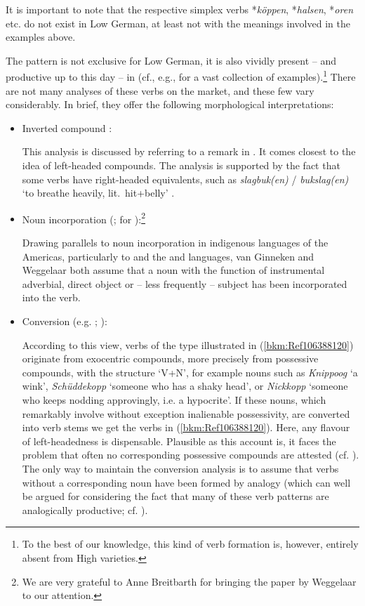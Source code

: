 \documentclass[output=paper
  ,nobabel
  ,draftmode
  ,colorlinks, citecolor=brown
]{langscibook}
\begin{document}
\noindent
It is important to note that the respective simplex verbs *\emph{köppen}, *\emph{halsen},
*\emph{oren} etc. do not exist in Low German, at least not with the meanings involved in the
examples above.

The pattern is not exclusive for Low German, it is also vividly present – and productive up to this
day – in  (cf., e.g., \citealt{AsdahlHolmberg1973} for a vast collection of
examples).\footnote{To the best of our knowledge, this kind of verb formation is, however, entirely
  absent from High  varieties.} There are not many analyses of these verbs on the market, and
these few vary considerably. In brief, they offer the following morphological interpretations:


\begin{itemize}
\item Inverted compound \citep{Henzen1965}:

This analysis is discussed by \citet[55--56]{AsdahlHolmberg1973} referring to a remark in
. It comes closest to the idea of left-headed compounds. The
analysis is supported by the fact that some verbs have right-headed equivalents, such as
\emph{slagbuk(en)} / \emph{bukslag(en)} `to breathe heavily, lit.\ hit+belly' \citep[53, 56]{AsdahlHolmberg1973}.

\largerpage
\item Noun incorporation (\citealt[Section~2]{vanGinneken1939}; \citealt{Weggelaar1986} for
  ):\footnote{We are very grateful to Anne Breitbarth for bringing the paper by Weggelaar
    to our attention.} 

Drawing parallels to noun incorporation in indigenous languages of the Americas, particularly to
 and the  and  languages, van Ginneken and Weggelaar both assume that a
noun with the function of instrumental adverbial, direct object or – less frequently – subject has
been incorporated into the verb.  

\item Conversion (e.g. \citealt[32--37]{Weise1920}; \citealt{AsdahlHolmberg1973}):

According to this view, verbs of the type illustrated in (\ref{bkm:Ref106388120}) originate from
exocentric compounds, more precisely from possessive compounds, with the structure `V+N', for
example nouns such as \emph{Knippoog} `a wink', \emph{Schüddekopp} `someone who has a shaky head',
or \emph{Nickkopp} `someone who keeps nodding approvingly, i.e. a hypocrite'. If these nouns, which
remarkably involve without exception inalienable possessivity, are converted into verb stems we get
the verbs in (\ref{bkm:Ref106388120}). Here, any flavour of left-headedness is
dispensable. Plausible as this account is, it faces the problem that often no corresponding
possessive compounds are attested (cf. \citealt[304]{Weggelaar1986}). The only way to maintain the
conversion analysis is to assume that verbs without a corresponding noun have been formed by analogy
(which can well be argued for considering the fact that many of these verb patterns are analogically
productive; cf. \citealt{AsdahlHolmberg1973}). 


\end{itemize}
\end{document}
